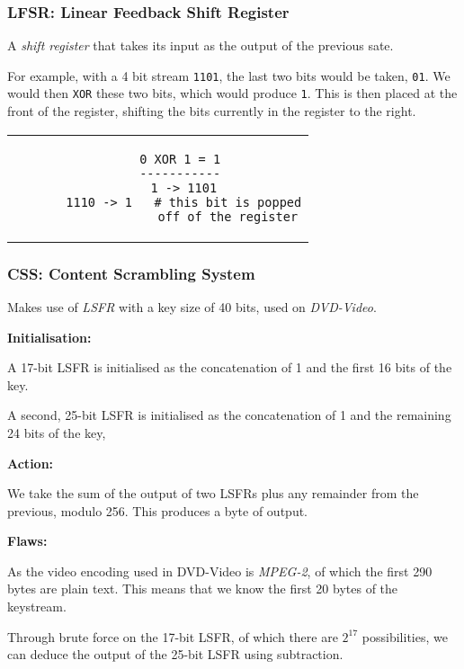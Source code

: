 \documentclass{article}
\begin{document}
\subsubsection{LFSR: Linear Feedback Shift Register}

A \textit{shift register} that takes its input as the output of the previous sate.

For example, with a 4 bit stream \texttt{1101}, the last two bits would be taken, \texttt{01}. We would then \texttt{XOR} these two bits, which would produce \texttt{1}. This is then placed at the front of the register, shifting the bits currently in the register to the right.

\begin{center}
  \begin{tabular}{c}
    \begin{lstlisting}
      0 XOR 1 = 1
      -----------
       1 -> 1101
       1110 -> 1   # this bit is popped
                   off of the register
    \end{lstlisting}
  \end{tabular}
\end{center}

\subsubsection{CSS: Content Scrambling System}

Makes use of \textit{LSFR} with a key size of 40 bits, used on \textit{DVD-Video}.

\textbf{Initialisation:}

A 17-bit LSFR is initialised as the concatenation of 1 and the first 16 bits of the key.

A second, 25-bit LSFR is initialised as the concatenation of 1 and the remaining 24 bits of the key,

\textbf{Action:}

We take the sum of the output of two LSFRs plus any remainder from the previous, modulo 256. This produces a byte of output.

\textbf{Flaws:}

As the video encoding used in DVD-Video is \textit{MPEG-2}, of which the first 290 bytes are plain text. This means that we know the first 20 bytes of the keystream.

Through brute force on the 17-bit LSFR, of which there are $2^{17}$ possibilities, we can deduce the output of the 25-bit LSFR using subtraction.
\end{document}
